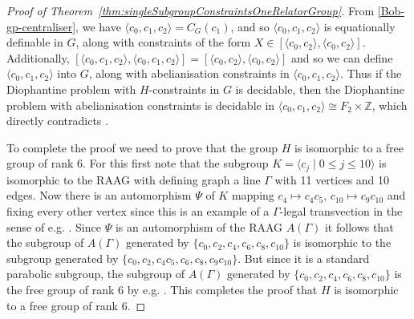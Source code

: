 \documentclass[11pt]{amsart}
\theoremstyle{definition}
\numberwithin{theorem}{section}
\newcommand{\Z}{\mathbb{Z}}
\begin{document}
\begin{proof}[Proof of Theorem~\ref{thm:singleSubgroupConstraintsOneRelatorGroup}]
From \cref{Bob-gp-centraliser}, we have \(\langle c_0, c_1, c_2 \rangle = C_G(c_1)\), and so \(\langle c_0, c_1, c_2 \rangle\) is equationally definable in \(G\), along with constraints of the form \(X \in [\langle c_0, c_2 \rangle,
\langle c_0, c_2 \rangle]\). Additionally, \([\langle c_0, c_1, c_2 \rangle, \langle c_0, c_1, c_2 \rangle] = [\langle c_0, c_2 \rangle, \langle c_0, c_2 \rangle]\) and so we can define \(\langle c_0, c_1, c_2 \rangle\) into \(G\), along with abelianisation constraints in \(\langle c_0, c_1, c_2 \rangle\). Thus if the Diophantine problem with \(H\)-constraints in \(G\) is decidable, then the Diophantine problem with abelianisation constraints is decidable in \(\langle c_0, c_1, c_2 \rangle \cong F_2 \times \Z\), which directly contradicts \cite[Theorem A]{CiobanuGarreta}. 

To complete the proof we need to prove that the group   
$H$
is isomorphic to a free group of rank $6$.    
For this first note that the subgroup 
$K = \langle c_j \mid 0 \leq j \leq 10 \rangle$
is isomorphic to the RAAG with defining graph a line $\Gamma$ with 11 vertices
and 10 edges. Now there is an automorphism $\Psi$ of $K$ mapping $c_4 \mapsto
c_4c_5$, $c_{10} \mapsto c_9c_{10}$ and fixing every other vertex since this is
an example of a $\Gamma$-legal transvection in the sense of e.g.
\cite[Section~2.5]{Vogtmann15}. Since $\Psi$ is an automorphism of the RAAG
$A(\Gamma)$ it follows that the subgroup of $A(\Gamma)$ generated by $\{ c_0,
c_2, c_4, c_6, c_8, c_{10} \}$ is isomorphic to the subgroup generated by  $\{
c_0, c_2, c_4c_5, c_6, c_8, c_9c_{10} \}$. But since it is a standard parabolic
subgroup, the subgroup of $A(\Gamma)$ generated by $\{ c_0, c_2, c_4, c_6, c_8,
c_{10} \}$ is the free group of rank 6 by e.g. \cite[Lemma 3.1]{AntolinFoniqi22}. This completes the proof that $H$ is
isomorphic to a free group of rank $6$.     
\end{proof}
\end{document}
